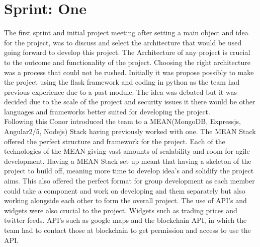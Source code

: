 \section{Sprint: One}
The first sprint and initial project meeting after setting a main object and idea for the project, was to discuss and select the architecture that would be used going forward to develop this project. The Architecture of any project is crucial to the outcome and functionality of the project. Choosing the right architecture was a process that could not be rushed. Initially it was propose possibly to make the project using the flask framework and coding in python as the team had previous experience due to  a past module. The idea was debated but it was decided due to the scale of the project and security issues it there would be other languages and frameworks better suited for developing the project. \\
Following this Conor introduced the team to a MEAN(MongoDB, Expressjs, Angular2/5, Nodejs) Stack having previously worked with one. The MEAN Stack offered the perfect structure and framework for the project. Each of the technologies of the MEAN giving vast amounts of scalability and room for agile development. Having a MEAN Stack set up meant that having a skeleton of the project to build off, meaning more time to develop idea's and solidify the project aims. This also offered the perfect format for group development as each member could take a component and work on developing and them separately but also working alongside each other to form the overall project. The use of API's and widgets were also crucial to the project. Widgets such as trading prices and twitter feeds. API's such as google maps and the blockchain API, in which the team had to contact those at blockchain to get permission and access to use the API.

